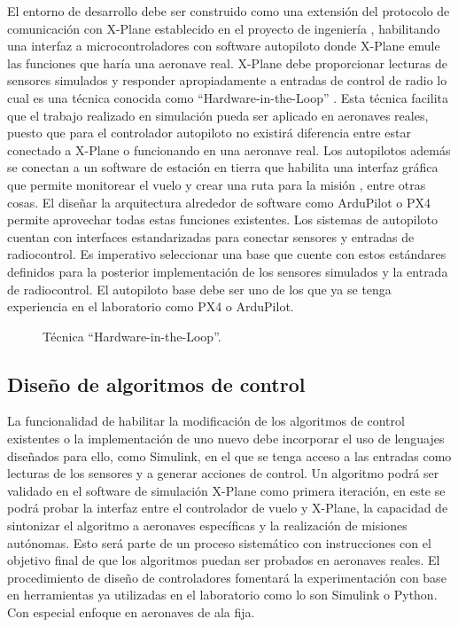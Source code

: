 El entorno de desarrollo debe ser construido como una extensión del protocolo de comunicación con X-Plane establecido en el proyecto de ingeniería \cite{pia}, habilitando una interfaz a microcontroladores con software autopiloto donde X-Plane emule las funciones que haría una aeronave real. X-Plane debe proporcionar lecturas de sensores simulados y responder apropiadamente a entradas de control de radio lo cual es una técnica conocida como ``Hardware-in-the-Loop'' \cite{pil}. Esta técnica facilita que el trabajo realizado en simulación pueda ser aplicado en aeronaves reales, puesto que para el controlador autopiloto no existirá diferencia entre estar conectado a X-Plane o funcionando en una aeronave real. Los autopilotos además se conectan a un software de estación en tierra que habilita una interfaz gráfica que permite monitorear el vuelo y crear una ruta para la misión \cite{ardupilot-gs}, entre otras cosas. El diseñar la arquitectura alrededor de software como ArduPilot o PX4 permite aprovechar todas estas funciones existentes. Los sistemas de autopiloto cuentan con interfaces estandarizadas para conectar sensores y entradas de radiocontrol. Es imperativo seleccionar una base que cuente con estos estándares definidos para la posterior implementación de los sensores simulados y la entrada de radiocontrol. El autopiloto base debe ser uno de los que ya se tenga experiencia en el laboratorio como PX4 o ArduPilot.

\begin{figure}[h]
    \centering
    
    \caption{Técnica ``Hardware-in-the-Loop''.}
    \label{fig:pil}
\end{figure}

\subsection{Diseño de algoritmos de control}

La funcionalidad de habilitar la modificación de los algoritmos de control existentes o la implementación de uno nuevo debe incorporar el uso de lenguajes diseñados para ello, como Simulink, en el que se tenga acceso a las entradas como lecturas de los sensores y a generar acciones de control. Un algoritmo podrá ser validado en el software de simulación X-Plane como primera iteración, en este se podrá probar la interfaz entre el controlador de vuelo y X-Plane, la capacidad de sintonizar el algoritmo a aeronaves específicas y la realización de misiones autónomas. Esto será parte de un proceso sistemático con instrucciones con el objetivo final de que los algoritmos puedan ser probados en aeronaves reales. El procedimiento de diseño de controladores fomentará la experimentación con base en herramientas ya utilizadas en el laboratorio como lo son Simulink o Python. Con especial enfoque en aeronaves de ala fija.

